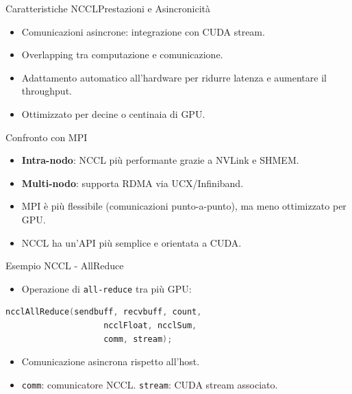 \documentclass{beamer}
\begin{document}
\begin{frame}{Caratteristiche NCCL}{Prestazioni e Asincronicità}
    \begin{itemize}
        \item Comunicazioni asincrone: integrazione con CUDA stream.
        \item Overlapping tra computazione e comunicazione.
        \item Adattamento automatico all’hardware per ridurre latenza e aumentare il throughput.
        \item Ottimizzato per decine o centinaia di GPU.
    \end{itemize}
\end{frame}

\begin{frame}{Confronto con MPI}
    \begin{itemize}
        \item \textbf{Intra-nodo}: NCCL più performante grazie a NVLink e SHMEM.
        \item \textbf{Multi-nodo}: supporta RDMA via UCX/Infiniband.
        \item MPI è più flessibile (comunicazioni punto-a-punto), ma meno ottimizzato per GPU.
        \item NCCL ha un'API più semplice e orientata a CUDA.
    \end{itemize}
\end{frame}

\begin{frame}[fragile]{Esempio NCCL - AllReduce}
    \begin{itemize}
        \item Operazione di \texttt{all-reduce} tra più GPU:
    \end{itemize}

    \begin{lstlisting}[language=C++, basicstyle=\ttfamily\small, keywordstyle=\color{blue}]
        ncclAllReduce(sendbuff, recvbuff, count,
                    ncclFloat, ncclSum,
                    comm, stream);
    \end{lstlisting}

    \begin{itemize}
        \item Comunicazione asincrona rispetto all’host.
        \item \texttt{comm}: comunicatore NCCL. \texttt{stream}: CUDA stream associato.
    \end{itemize}
\end{frame}
\end{document}
